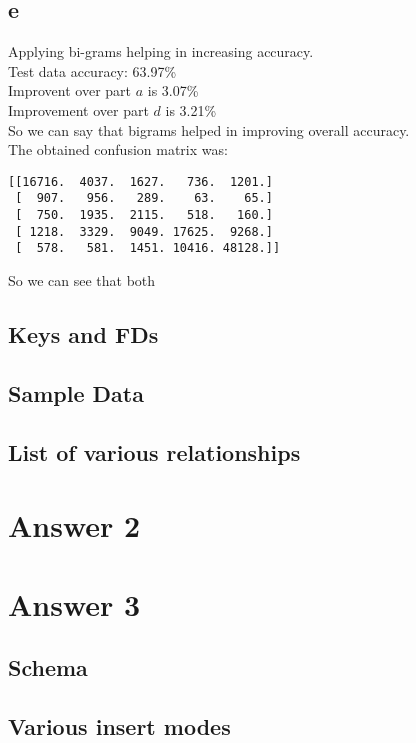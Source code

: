 \documentclass[10pt]{article}
\begin{document}
\subsection{e}
Applying bi-grams helping in increasing accuracy.\\
Test data accuracy: 63.97\%\\
Improvent over part $a$ is 3.07\%\\
Improvement over part $d$ is 3.21\%\\
So we can say that bigrams helped in improving overall accuracy.\\
The obtained confusion matrix was:\\
\begin{lstlisting}
[[16716.  4037.  1627.   736.  1201.]
 [  907.   956.   289.    63.    65.]
 [  750.  1935.  2115.   518.   160.]
 [ 1218.  3329.  9049. 17625.  9268.]
 [  578.   581.  1451. 10416. 48128.]]
\end{lstlisting}
So we can see that both 
\subsection{Keys and FDs}
\subsection{Sample Data}
\subsection{List of various relationships}

\section{Answer 2}

\section{Answer 3}
\subsection{Schema}
\subsection{Various insert modes}
\end{document}
